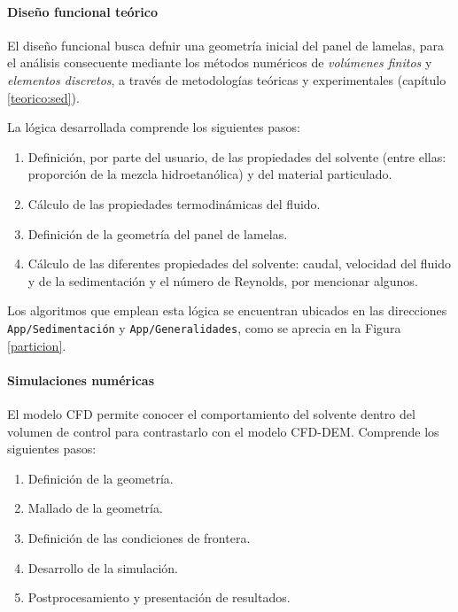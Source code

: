 \newpage

\paragraph{Dise\~no funcional te\'orico}

\noindent
\justify

El dise\~no funcional busca defnir una geometr\'ia inicial del panel de lamelas, para el an\'alisis consecuente mediante los m\'etodos num\'ericos de \textit{vol\'umenes finitos} y \textit{elementos discretos}, a trav\'es de metodolog\'ias te\'oricas y experimentales (cap\'itulo \ref{teorico:sed}).

\noindent
\justify

La l\'ogica desarrollada comprende los siguientes pasos:

\begin{enumerate}
	\item Definici\'on, por parte del usuario, de las propiedades del solvente (entre ellas: proporci\'on de la mezcla hidroetan\'olica) y del material particulado.
	\item C\'alculo de las propiedades termodin\'amicas del fluido.
	\item Definici\'on de la geometr\'ia del panel de lamelas.
	\item C\'alculo de las diferentes propiedades del solvente: caudal, velocidad del fluido y de la sedimentaci\'on y el n\'umero de Reynolds, por mencionar algunos.
\end{enumerate}

\noindent
\justify

Los algoritmos que emplean esta l\'ogica se encuentran ubicados en las direcciones \texttt{App/Sedimentaci\'on} y \texttt{App/Generalidades}, como se aprecia en la Figura \ref{particion}.

\paragraph{Simulaciones num\'ericas} \label{imp:CFD}

\noindent
\justify

El modelo CFD permite conocer el comportamiento del solvente dentro del volumen de control para contrastarlo con el modelo CFD-DEM. Comprende los siguientes pasos:

\begin{enumerate}
	\item Definici\'on de la geometr\'ia.
	\item Mallado de la geometr\'ia.
	\item Definici\'on de las condiciones de frontera.
	\item Desarrollo de la simulaci\'on.
	\item Postprocesamiento y presentaci\'on de resultados.
\end{enumerate}

